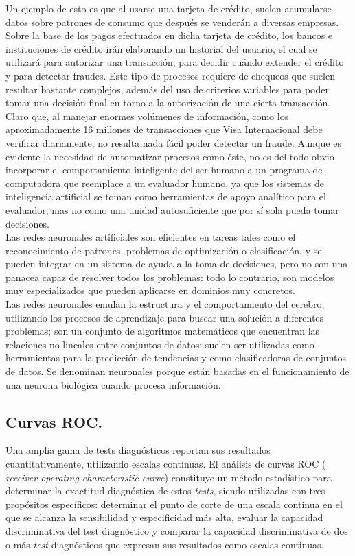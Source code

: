 Un ejemplo de esto es que al usarse una tarjeta de crédito, suelen acumularse datos sobre patrones de consumo que después se venderán a diversas empresas. Sobre la base de los pagos efectuados en dicha tarjeta de crédito, los bancos e instituciones de crédito irán elaborando un historial del usuario, el cual se utilizará para autorizar una transacción, para decidir cuándo extender el crédito y para detectar fraudes. Este tipo de procesos requiere de chequeos que suelen resultar bastante complejos, además del uso de criterios variables para poder tomar una decisión final en torno a la autorización de una cierta transacción. Claro que, al manejar enormes volúmenes de información, como los aproximadamente 16 millones de transacciones que Visa Internacional debe verificar diariamente, no resulta nada fácil poder detectar un fraude. Aunque es evidente la necesidad de automatizar procesos como éste, no es del todo obvio incorporar el comportamiento inteligente del ser humano a un programa de computadora que reemplace a un evaluador humano, ya que los sistemas de inteligencia artificial se toman como herramientas de apoyo analítico para el evaluador, mas no como una unidad autosuficiente que por sí sola pueda tomar decisiones.\\

Las redes neuronales artificiales son eficientes en tareas tales como el reconocimiento de patrones, problemas de optimización o clasificación, y se pueden integrar en un sistema de ayuda a la toma de decisiones, pero no son una panacea capaz de resolver todos los problemas: todo lo contrario, son modelos muy especializados que pueden aplicarse en dominios muy concretos.\\

Las redes neuronales emulan la estructura y el comportamiento del cerebro, utilizando los procesos de aprendizaje para buscar una solución a diferentes problemas; son un conjunto de algoritmos matemáticos que encuentran las relaciones no lineales entre conjuntos de datos; suelen ser utilizadas como herramientas para la predicción de tendencias y como clasificadoras de conjuntos de datos. Se denominan neuronales porque están basadas en el funcionamiento de una neurona biológica cuando procesa información.

\subsection{Curvas ROC.}

Una amplia gama de tests diagnósticos reportan sus resultados cuantitativamente, utilizando escalas contínuas. El análisis de curvas ROC ( \textit{receiver operating characteristic curve}) constituye un método estadístico para determinar la exactitud diagnóstica de estos \textit{tests}, siendo utilizadas con tres propósitos específicos: determinar el punto de corte de una escala continua en el que se alcanza la sensibilidad y especificidad más alta, evaluar la capacidad discriminativa del test diagnóstico y comparar la capacidad discriminativa de dos o más \textit{test} diagnósticos que expresan sus resultados como escalas continuas.

